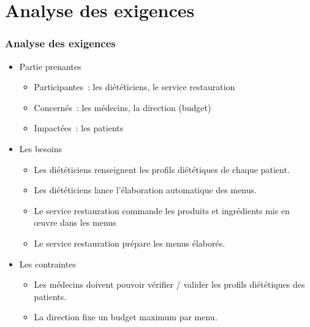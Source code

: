 \documentclass{beamer}
\begin{document}
\section{Analyse des exigences}
\begin{frame}[label=analyseDesExigences] %
\frametitle{Analyse des exigences}
\begin{itemize}
  \item Partie prenantes
  \begin{itemize}
    \item Participantes~: les diététiciens, le service restauration
    \item Concernés~: les médecins, la direction (budget)
    \item Impactées~: les patients
  \end{itemize}
  \item Les besoins
  \begin{itemize}
    \item Les diététiciens renseignent les profils diététiques de chaque patient.
    \item Les diététiciens lance l'élaboration automatique des menus.
    \item Le service restauration commande les produits et ingrédients mis en œuvre dans les menus
    \item Le service restauration prépare les menus élaborés.
  \end{itemize}
  \item Les contraintes
  \begin{itemize}
    \item Les médecins doivent pouvoir vérifier / valider les profils diététiques des patients.
    \item La direction fixe un budget maximum par menu.
  \end{itemize}
\end{itemize}
\end{frame}
\end{document}
